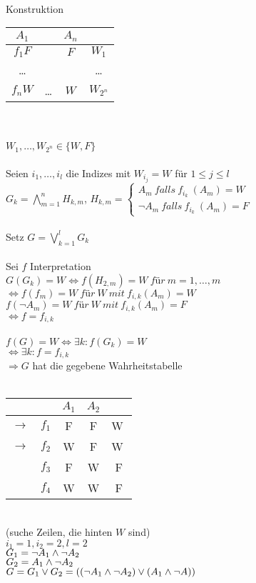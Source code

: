 \noindent\\
Konstruktion\\

\begin{tabular}{c|c|c|c}
$A_1$ &  & $A_n$ &  \\
\hline
$f_1 F$ &  & $F$ & $W_1$\\
…   &  &  & … \\
$f_n W$ & … & $W$ & $W_{2^n}$ \\
\end{tabular}\\
\noindent\\
$W_1, …, W_{2^n} \in \{W, F\}$\\
    
\noindent\\
Seien $i_1, …, i_l$ die Indizes mit $W_{i_j} = W$ für $1 \leq j \leq l$\\
$G_k = \bigwedge_{m=1}^n H_{k,m}$, $H_{k,m} = \begin{cases} A_m\ falls\ f_{i_k}\ (A_m)=W \\ \neg A_m\ falls\ f_{i_k}\ (A_m)=F \end{cases}$\\
    
\noindent\\
Setz $G = \bigvee_{k=1}^l G_k$\\
    
\noindent\\
Sei $f$ Interpretation\\
$G(G_k) = W \Leftrightarrow f(H_{2,m}) = W\ für\ m=1, …, m$\\
$\Leftrightarrow f(f_m) = W\ für\ W\ mit\ f_{i,k}(A_m) = W$\\
$f(\neg A_m) = W\ für\ W\ mit\ f_{i,k}(A_m) = F$\\
$\Leftrightarrow f = f_{i,k}$\\

\noindent\\
$f(G) = W \Leftrightarrow \exists k : f(G_k) = W$\\
$\Leftrightarrow \exists k: f= f_{i,k}$\\
$\Rightarrow G$ hat die gegebene Wahrheitstabelle\\
    
\beispiel{}\\
\begin{tabular}{cc|c|c|c}
 &  & $A_1$ & $A_2$ &   \\
\hline
$\rightarrow$ & $f_1$ & F & F & \textcircled{W}\\
$\rightarrow$ & $f_2$ & W & F & \textcircled{W}\\
 & $f_3$ & F & W & F\\
 & $f_4$ & W & W & F\\
\end{tabular}\\
(suche Zeilen, die hinten $W$ sind)\\

\noindent
$i_1 = 1, i_2 = 2, l=2$\\
$G_1 = \neg A_1 \wedge \neg A_2$\\
$G_2 = A_1 \wedge \neg A_2$\\
$G = G_1 \vee G_2 = (( \neg A_1 \wedge \neg A_2) \vee (A_1 \wedge \neg A))$\\

